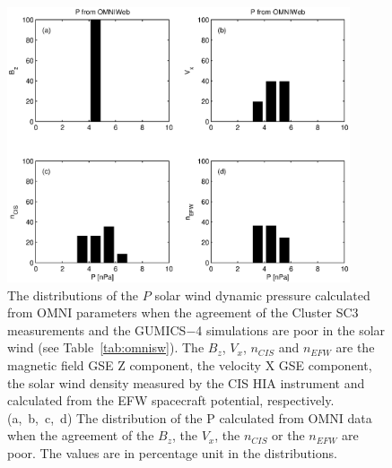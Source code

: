 \documentclass[linenumbers,draft]{agujournal}
\begin{document}
\begin{figure}[h]
\centering
\includegraphics[width=0.9\textwidth,angle=0]{swe-2020-corr-f16.eps}  
\caption{The distributions of the $P$ solar wind dynamic pressure calculated from OMNI parameters when the agreement of the Cluster SC3 measurements and the GUMICS$-$4 simulations are poor in the solar wind (see Table~\ref{tab:omnisw}). The $B_{z}$, $V_{x}$, $n_{CIS}$ and $n_{EFW}$ are the magnetic field GSE Z component, the velocity X GSE component, the solar wind density measured by the CIS HIA instrument and calculated from the EFW spacecraft potential, respectively. (a,~b,~c,~d) The distribution of the P calculated from OMNI data when the agreement of the $B_{z}$, the $V_{x}$, the $n_{CIS}$ or the $n_{EFW}$ are poor. The values are in percentage unit in the distributions.}
\label{fig:swomnip}
\end{figure}

\pagebreak
\end{document}
